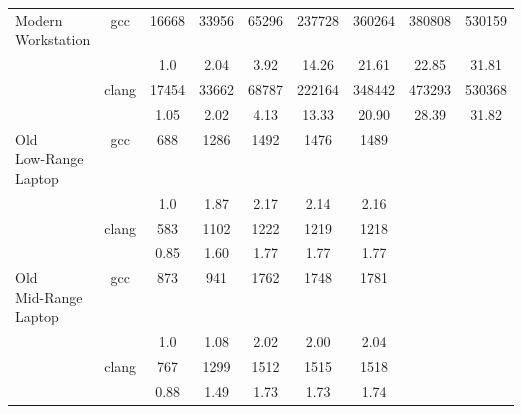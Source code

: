 \begin{table}[H]
\begin{tabularx}{\linewidth}{X c c c c c c c c}
            \midrule
\multirowcell{4}{Modern\\ Workstation} & 
\multirow{2}{*}{gcc} & 16668 & 33956 & 65296 & 237728 & 360264 & 380808 & 530159\\
 & & 1.0 & 2.04 & 3.92 & 14.26 & 21.61 & 22.85 & 31.81\\
\cmidrule[0.05em](){3-9} & 
\multirow{2}{*}{clang} & 17454 & 33662 & 68787 & 222164 & 348442 & 473293 & 530368\\
 & & 1.05 & 2.02 & 4.13 & 13.33 & 20.90 & 28.39 & 31.82\\
            \midrule
\multirowcell{4}{Old\\ Low-Range\\ Laptop} & 
\multirow{2}{*}{gcc} & 688 & 1286 & 1492 & 1476 & 1489\\
 & & 1.0 & 1.87 & 2.17 & 2.14 & 2.16\\
\cmidrule[0.05em](){3-9} & 
\multirow{2}{*}{clang} & 583 & 1102 & 1222 & 1219 & 1218\\
 & & 0.85 & 1.60 & 1.77 & 1.77 & 1.77\\
            \midrule
\multirowcell{4}{Old\\ Mid-Range\\ Laptop} & 
\multirow{2}{*}{gcc} & 873 & 941 & 1762 & 1748 & 1781\\
 & & 1.0 & 1.08 & 2.02 & 2.00 & 2.04\\
\cmidrule[0.05em](){3-9} & 
\multirow{2}{*}{clang} & 767 & 1299 & 1512 & 1515 & 1518\\
 & & 0.88 & 1.49 & 1.73 & 1.73 & 1.74 \\
            \bottomrule
        \end{tabularx}
    \end{table}
    